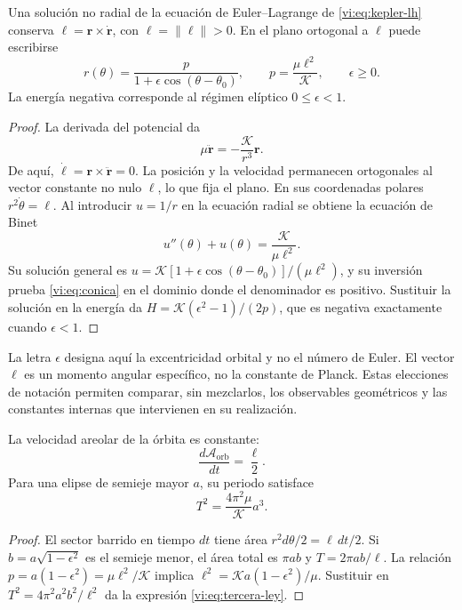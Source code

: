 \begin{proposition}
\label{vi:prop:conica}
Una solución no radial de la ecuación de Euler--Lagrange de
\eqref{vi:eq:kepler-lh} conserva
$\boldsymbol\ell=\mathbf r\times\dot{\mathbf r}$, con
$\ell=\|\boldsymbol\ell\|>0$. En el plano ortogonal a
$\boldsymbol\ell$ puede escribirse
\begin{equation}
 r(\theta)=\frac{p}{1+\epsilon\cos(\theta-\theta_0)},
 \qquad p=\frac{\mu\ell^2}{\mathcal K},
 \qquad \epsilon\geq0.
 \label{vi:eq:conica}
\end{equation}
La energía negativa corresponde al régimen elíptico
$0\leq\epsilon<1$.
\end{proposition}
\begin{proof}
La derivada del potencial da
\begin{equation}
 \mu\ddot{\mathbf r}=-\frac{\mathcal K}{r^3}\mathbf r.
 \label{vi:eq:fuerza-central}
\end{equation}
De aquí,
$\dot{\boldsymbol\ell}=\mathbf r\times\ddot{\mathbf r}=0$.
La posición y la velocidad permanecen ortogonales al vector
constante no nulo $\boldsymbol\ell$, lo que fija el plano.
En sus coordenadas polares $r^2\dot\theta=\ell$. Al introducir
$u=1/r$ en la ecuación radial se obtiene la ecuación de Binet
\[
 u''(\theta)+u(\theta)=\frac{\mathcal K}{\mu\ell^2}.
\]
Su solución general es
$u=\mathcal K[1+\epsilon\cos(\theta-\theta_0)]/(\mu\ell^2)$,
y su inversión prueba \eqref{vi:eq:conica} en el dominio
donde el denominador es positivo. Sustituir la solución en
la energía da
$H=\mathcal K(\epsilon^2-1)/(2p)$, que es negativa
exactamente cuando $\epsilon<1$.
\end{proof}

La letra $\epsilon$ designa aquí la excentricidad orbital y
no el número de Euler. El vector $\boldsymbol\ell$ es un
momento angular específico, no la constante de Planck.
Estas elecciones de notación permiten comparar, sin mezclarlos,
los observables geométricos y las constantes internas que
intervienen en su realización.

\begin{proposition}
\label{vi:prop:ley-areal}
La velocidad areolar de la órbita es constante:
\begin{equation}
 \frac{d\mathcal A_{\mathrm{orb}}}{dt}=\frac\ell2.
 \label{vi:eq:ley-areal}
\end{equation}
Para una elipse de semieje mayor $a$, su periodo satisface
\begin{equation}
 T^2=\frac{4\pi^2\mu}{\mathcal K}a^3.
 \label{vi:eq:tercera-ley}
\end{equation}
\end{proposition}
\begin{proof}
El sector barrido en tiempo $dt$ tiene área
$r^2d\theta/2=\ell\,dt/2$. Si $b=a\sqrt{1-\epsilon^2}$
es el semieje menor, el área total es $\pi ab$ y
$T=2\pi ab/\ell$. La relación
$p=a(1-\epsilon^2)=\mu\ell^2/\mathcal K$ implica
$\ell^2=\mathcal K a(1-\epsilon^2)/\mu$.
Sustituir en $T^2=4\pi^2a^2b^2/\ell^2$ da la expresión
\eqref{vi:eq:tercera-ley}.
\end{proof}

